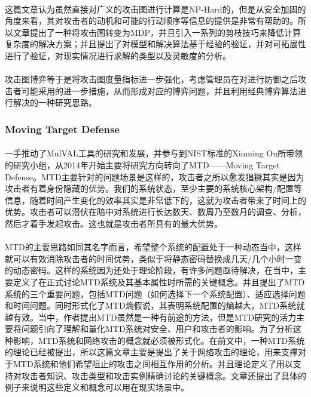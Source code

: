 \documentclass[12pt,a4paper]{article}
\begin{document}
\paragraph{}
这篇文章认为虽然直接对广义的攻击图进行计算是NP-Hard的，但是从安全加固的角度来看，其对攻击者的动机和可能的行动顺序等信息的提供是非常有帮助的。所以文章提出了一种将攻击图转变为MDP，并且引入一系列的剪枝技巧来降低计算复杂度的解决方案；并且提出了对模型和解决算法基于经验的验证，并对可拓展性进行了验证，对现实情况进行求解的类型以及灵敏度的分析。
\paragraph{}
攻击图博弈等于是将攻击图度量指标进一步强化，考虑管理员在对进行防御之后攻击者可能采用的进一步措施，从而形成对应的博弈问题，并且利用经典博弈算法进行解决的一种研究思路。

\subsubsection{Moving Target Defense}
\paragraph{}
一手推动了MulVAL工具\cite{8}\cite{9}的研究和发展，并参与到NIST标准\cite{1}的Xinming Ou所带领的研究小组，从2014年开始主要将研究方向转向了MTD——Moving Target Defense\cite{16}\cite{17}。MTD主要针对的问题场景是这样的，攻击者之所以愈发猖獗其实是因为攻击者有着身份隐藏的优势。我们的系统状态，至少主要的系统核心架构/配置等信息，随着时间产生变化的效率其实是非常低下的，这就为攻击者带来了时间上的优势。攻击者可以潜伏在暗中对系统进行长达数天、数周乃至数月的调查、分析，然后才着手发起攻击。这也就是攻击者所具有的最大优势。
\paragraph{}
MTD的主要思路如同其名字而言，希望整个系统的配置处于一种动态当中，这样就可以有效消除攻击者的时间优势，类似于将静态密码替换成几天/几个小时一变的动态密码。这样的系统因为还处于理论阶段，有许多问题亟待解决，在\cite{16}当中，主要定义了在正式讨论MTD系统及其基本属性时所需的关键概念。并且提出了MTD系统的三个重要问题，包括MTD问题（如何选择下一个系统配置）、适应选择问题和时间问题。同时形式化了MTD熵假说，其表明系统配置的熵越大，MTD系统就越有效。\cite{17}当中，作者提出MTD虽然是一种有前途的方法，但是MTD研究的活力主要将问题引向了理解和量化MTD系统对安全、用户和攻击者的影响。为了分析这种影响，MTD系统和网络攻击的概念就必须被形式化。在前文\cite{16}中，一种MTD系统的理论已经被提出，所以这篇文章主要是提出了关于网络攻击的理论，用来支撑对于MTD系统和他们希望阻止的攻击之间相互作用的分析。并且理论定义了用以支持对攻击者知识、攻击类型和攻击实例精确讨论的关键概念。文章还提出了具体的例子来说明这些定义和概念可以用在现实场景中。
\end{document}
